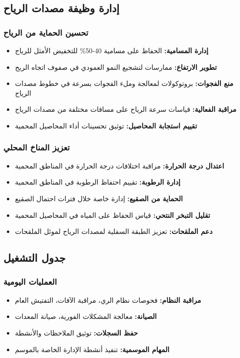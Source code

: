 \subsection{إدارة وظيفة مصدات الرياح}

\subsubsection{تحسين الحماية من الرياح}
\begin{itemize}
    \item \textbf{إدارة المسامية:} الحفاظ على مسامية 40-50\% للتخفيض الأمثل للرياح
    \item \textbf{تطوير الارتفاع:} ممارسات لتشجيع النمو العمودي في صفوف اتجاه الريح
    \item \textbf{منع الفجوات:} بروتوكولات لمعالجة وملء الفجوات بسرعة في خطوط مصدات الرياح
    \item \textbf{مراقبة الفعالية:} قياسات سرعة الرياح على مسافات مختلفة من مصدات الرياح
    \item \textbf{تقييم استجابة المحاصيل:} توثيق تحسينات أداء المحاصيل المحمية
\end{itemize}

\subsubsection{تعزيز المناخ المحلي}
\begin{itemize}
    \item \textbf{اعتدال درجة الحرارة:} مراقبة اختلافات درجة الحرارة في المناطق المحمية
    \item \textbf{إدارة الرطوبة:} تقييم احتفاظ الرطوبة في المناطق المحمية
    \item \textbf{الحماية من الصقيع:} إدارة خاصة خلال فترات احتمال الصقيع
    \item \textbf{تقليل التبخر النتحي:} قياس الحفاظ على المياه في المحاصيل المحمية
    \item \textbf{دعم الملقحات:} تعزيز الطبقة السفلية لمصدات الرياح لموئل الملقحات
\end{itemize}

\subsection{جدول التشغيل}

\subsubsection{العمليات اليومية}
\begin{itemize}
    \item \textbf{مراقبة النظام:} فحوصات نظام الري، مراقبة الآفات، التفتيش العام
    \item \textbf{الصيانة:} معالجة المشكلات الفورية، صيانة المعدات
    \item \textbf{حفظ السجلات:} توثيق الملاحظات والأنشطة
    \item \textbf{المهام الموسمية:} تنفيذ أنشطة الإدارة الخاصة بالموسم
\end{itemize}


